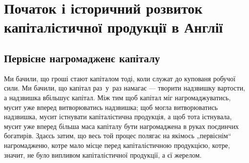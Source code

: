 
\setcounter{chapter}{23}
\section[Початок і історичний розвиток
капіталістичної продукції в Англії]{Початок і історичний розвиток капіталістичної продукції в Англії\footnotemarkZ{}}


\subsection{Первісне нагромадженє капіталу}

Ми бачили, що гроші стают капіталом тоді, коли служат
до купованя робучої сили. Ми бачили, що капітал
раз~у~раз намагає — творити надзвишку вартости, а надзвишка
вбільшує капітал. Між тим щоб капітал міг нагромаджуватись,
мусит уже вперед витворюватись надзвишка;
щоб могла витворюватись надзвишка, мусит істнувати капіталістична
продукція, а щоб тота істнувала, мусит уже
вперед більша маса капіталу бути нагромаджена в руках
поєдинчих богатирів. Здаєсь затим, що весь той процес
полягає на якімось „первіснім“ нагромадженю, котре мало
місце перед капіталістичною продукцією, котре, значит, не
було випливом капіталістичної продукції, а єї жерелом.

